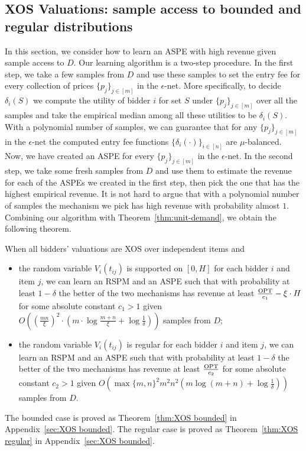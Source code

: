 \subsection{XOS Valuations: sample access to bounded and regular distributions}\label{sec:XOS sample}
In this section, we consider how to learn an ASPE with high revenue given sample access to $D$. Our learning algorithm is a two-step procedure. In the first step, we take a few samples from $D$ and use these samples to set the entry fee for every collection of prices $\{p_j\}_{j\in[m]}$ in the $\epsilon$-net. More specifically, to decide $\delta_i(S)$ we compute the utility of bidder $i$ for set $S$ under $\{p_j\}_{j\in[m]}$ over all the samples and take the empirical median among all these utilities to be $\delta_i(S)$. With a polynomial number of samples, we can guarantee that for any $\{p_j\}_{j\in[m]}$ in the $\epsilon$-net the computed entry fee functions $\{\delta_i(\cdot)\}_{i\in[n]}$ are $\mu$-balanced. Now, we have created an ASPE for every $\{p_j\}_{j\in[m]}$ in the $\epsilon$-net. In the second step, we take some fresh samples from $D$ and use them to estimate the revenue for each of the ASPEs we created in the first step,  then pick the one that has the highest empirical revenue. It is not hard to argue that with a polynomial number of samples the mechanism we pick has high revenue with probability almost $1$. Combining our algorithm with Theorem~\ref{thm:unit-demand}, we obtain the following theorem.
\begin{theorem}\label{thm:XOS sample}
	When all bidders' valuations are XOS over independent items and
	\begin{itemize}
		\item the random variable $V_i(t_{ij})$ is supported on $[0,H]$ for each bidder $i$ and item $j$, we can learn an RSPM and an ASPE such that with probability at least $1-\delta$ the better of the two mechanisms has revenue at least $\frac{\text{OPT}}{c_1}-\xi\cdot H$ for some absolute constant $c_1>1$ given $O\left((\frac{mn}{\xi})^2 \cdot (m\cdot\log \frac{m+n}{\xi} + \log \frac{1}{\delta})\right)$ samples from $D$; 
		\item  the random variable $V_i(t_{ij})$ is regular for each bidder $i$ and item $j$, we can learn an RSPM and an ASPE such that with probability at least $1-\delta$ the better of the two mechanisms has revenue at least $\frac{\text{OPT}}{c_2}$ for some absolute constant $c_2>1$ given $O\left(\max\{m,n\}^2m^2n^2 \left(m\log ({m+n}) + \log \frac{1}{\delta}\right)\right)$  samples from $D$.
	\end{itemize}
\end{theorem}

 The bounded case is proved as Theorem~\ref{thm:XOS bounded} in Appendix~\ref{sec:XOS bounded}.  The regular case is proved as Theorem~\ref{thm:XOS regular} in Appendix~\ref{sec:XOS bounded}.
